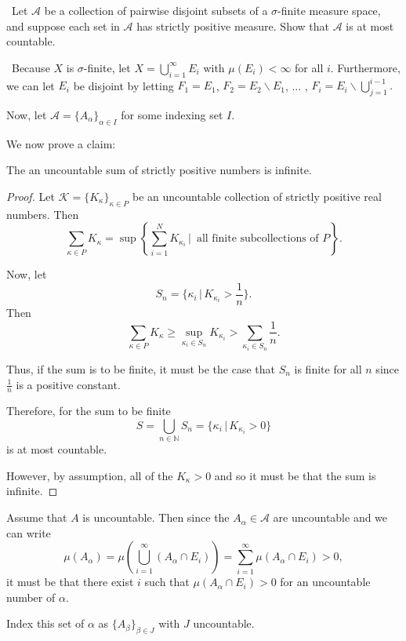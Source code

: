 \documentclass[12pt]{Qual}
\begin{document}
\begin{problem} $\,$
Let $\mathscr{A}$ be a collection of pairwise disjoint subsets of a $\sigma$-finite measure space, and suppose each set in $\mathscr{A}$ has strictly positive measure. Show that $\mathscr{A}$ is at most countable.
\end{problem}


\begin{solution}$\,$
Because $X$ is $\sigma$-finite, let $X=\bigcup_{i=1}^\infty E_i$ with $\mu(E_i)<\infty$ for all $i.$ Furthermore, we can let $E_i$ be disjoint by letting $F_1=E_1$, $F_2=E_2\backslash E_1$, ... , $F_i=E_i\backslash \bigcup_{j=1}^{i-1}.$ %

Now, let $\mathscr{A}=\{A_\alpha\}_{\alpha\in I}$ for some indexing set $I$.

We now prove a claim:
\begin{claim} The an uncountable sum of strictly positive numbers is infinite.
\begin{proof} Let $\mathscr{K}=\{K_\kappa\}_{\kappa\in P}$ be an uncountable collection of strictly positive real numbers. Then $$\sum_{\kappa\in P}K_\kappa=\sup\left\{\sum_{i=1}^NK_{\kappa_i}\,|\,\text{ all finite subcollections of }P\right\}.$$

Now, let $$S_n=\{\kappa_i\,|\,K_{\kappa_i}>\frac{1}{n}\}.$$ Then $$\sum_{\kappa\in P}K_\kappa\ge\sup_{\kappa_i\in S_n}K_{\kappa_i}>\sum_{\kappa_i\in S_n}\frac{1}{n}.$$

Thus, if the sum is to be finite, it must be the case that $S_n$ is finite for all $n$ since $\frac{1}{n}$ is a positive constant.

Therefore, for the sum to be finite $$S=\bigcup_{n\in\mathbb{N}}S_n=\{\kappa_i\,|\,K_{\kappa_i}>0\}$$ is at most countable.

However, by assumption, all of the $K_\kappa>0$ and so it must be that the sum is infinite.
\end{proof}
\end{claim}

Assume that $A$ is uncountable. Then since the $A_\alpha\in\mathscr{A}$ are uncountable and we can write $$\mu(A_\alpha)=\mu(\bigcup_{i=1}^\infty(A_\alpha\cap E_i))=\sum_{i=1}^\infty\mu(A_\alpha\cap E_i)>0,$$ it must be that there exist $i$ such that $\mu(A_\alpha\cap E_i)>0$ for an uncountable number of $\alpha$.

Index this set of $\alpha$ as $\{A_\beta\}_{\beta\in J}$ with $J$ uncountable.


\end{solution}
\end{document}

